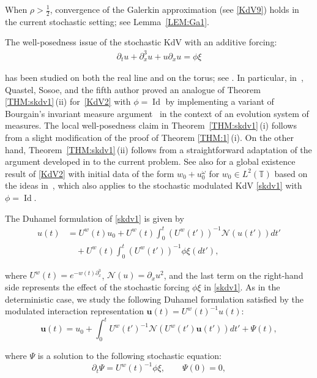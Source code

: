 \documentclass[letterpaper, 11pt,  reqno]{amsart}
\DeclareMathOperator{\Id}{Id}
\newcommand{\1}{\hspace{0.5mm}\text{I}\hspace{0.5mm}}
\newcommand{\noi}{\noindent}
\newcommand{\T}{\mathbb{T}}
\newcommand{\dx}{\partial_x}
\newcommand{\dt}{\partial_t}
\renewcommand{\o}{\omega}
\newcommand{\NN}{\mathcal{N}}
\newcommand{\uw}{U^w}
\newcommand{\uu}{\mathbf{u}}
\numberwithin{equation}{section}
\numberwithin{theorem}{section}
\begin{document}
When $\rho > \frac 12$, 
convergence of the Galerkin approximation (see \eqref{KdV9}) holds
in the current stochastic setting;
see Lemma~\ref{LEM:Ga1}.

The well-posedness issue of the stochastic KdV with an additive forcing:
\begin{align}
\dt u + \dx^3 u + u \dx u = \phi \xi
\label{KdV2}
\end{align}

\noi
 has 
been studied   on both the real line and on the torus;
see \cite{DDT2, DDT1, Oh2, OQS}.
In particular, in~\cite{OQS}, 
Quastel, Sosoe, and the fifth author
proved an analogue of Theorem \ref{THM:skdv1}\,(ii)
for~\eqref{KdV2}
with $\phi = \Id$
by implementing 
 a variant of Bourgain's invariant measure argument~\cite{BO94}
in the context of an evolution system of measures.
The local well-posedness claim 
in Theorem~\ref{THM:skdv1}\,(i)
follows from a slight modification 
of the proof of Theorem \ref{THM:1}\,(i).
On the other hand, 
Theorem~\ref{THM:skdv1}\,(ii)
follows from 
a straightforward adaptation of  the argument developed in \cite{OQS} to the current problem.
See also \cite[Corollary 1.3\,(ii)]{OQS}
for a global existence result of \eqref{KdV2}
with initial data of the form 
$w_0 + u_0^\o$ for $w_0 \in L^2(\T)$ based on the ideas in~\cite{OQ}, 
which also applies to the stochastic modulated KdV \eqref{skdv1}
with $\phi = \Id$.


The Duhamel formulation of  \eqref{skdv1} is given by 
\begin{align*}
u(t) & = U^w(t) u_0 +  U^w({t}) \int_0^t  (U^w({t'}))^{-1}\NN( u(t') ) dt'\\
& \quad + U^w({t}) \int_0^t  (U^w({t'}))^{-1} \phi \xi( dt'), 
\end{align*}


\noi
where 
$\uw (t)=e^{-   w(t)\dx^3}  $, 
$\NN(u) = \dx  u^2 $, 
and 
 the last term on the right-hand side 
represents
the effect of the stochastic forcing $\phi\xi$ in \eqref{skdv1}.
As in the deterministic case, 
we study the following Duhamel formulation satisfied by 
the modulated interaction representation $\uu(t) = \uw(t)^{-1}u(t)$:
\begin{equation}
\uu(t) = u_0 + \int_0 ^t \uw(t')^{-1}\NN(\uw(t') \uu(t'))dt'
+ \Psi(t), 
\label{mild4}
\end{equation}

\noi
where $\Psi$ is 
a solution to the following stochastic equation:
\begin{equation*}
\dt \Psi = \uw(t)^{-1} \phi \xi, \qquad \Psi(0) = 0,
\end{equation*}
\end{document}
